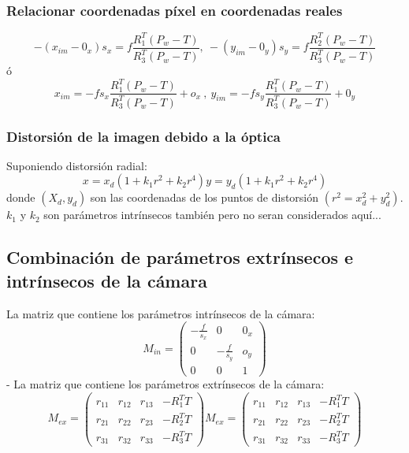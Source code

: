\subsubsection{Relacionar coordenadas píxel en coordenadas reales}

\begin{equation}
-\left(x_{im}-0_x\right)s_x={f}\frac{R^T_1\left(P_{w}-T\right)}{R^T_3\left(P_{w}-T\right)},\ -\left(y_{im}-0_y\right)s_y={f}\frac{R^T_2\left(P_{w}-T\right)}{R^T_3\left(P_{w}-T\right)}
\end{equation}
ó
\begin{equation}
x_{im}=-fs_x\frac{R^T_1\left(P_{w}-T\right)}{R^T_3\left(P_{w}-T\right)}+o_x\ ,\ y_{im}=-fs_y\frac{R^T_1\left(P_{w}-T\right)}{R^T_3\left(P_{w}-T\right)}+0_y
\end{equation}

\subsubsection{Distorsión de la imagen debido a la óptica}

Suponiendo distorsión radial:
\begin{equation}
  x=x_d\left(1+k_1r^2+k_2r^4\right)
  y=y_d\left(1+k_1r^2+k_2r^4\right)
\end{equation}
donde $({X_d}, {y_d})$ son las coordenadas de los puntos de distorsión $(r^2=x_d^2+y_d^2)$. $
{k_1}$ y ${k_2}$ son parámetros intrínsecos también pero no seran considerados aquí...

\subsection{Combinación de parámetros extrínsecos e intrínsecos de la cámara}

La matriz que contiene los parámetros intrínsecos de la cámara:
\begin{equation}
M_{in}=\begin{pmatrix}-\frac{f}{s_x} & 0 & 0_{x}\\0 & -\frac{f}{s_y} & o_y\\0 & 0 & 1\end{pmatrix}
\end{equation}
- La matriz que contiene los parámetros extrínsecos de la cámara:
\begin{equation}
M_{ex}=\begin{pmatrix}r_{11} & r_{12} & r_{13} & -R_1^TT\\r_{21} & r_{22} & r_{23} & -R_2^TT\\r_{31} & r_{32} & r_{33} & -R_3^TT\end{pmatrix}M_{ex}=\begin{pmatrix}r_{11} & r_{12} & r_{13} & -R_1^TT\\r_{21} & r_{22} & r_{23} & -R_2^TT\\r_{31} & r_{32} & r_{33} & -R_3^TT\end{pmatrix}
\end{equation}

